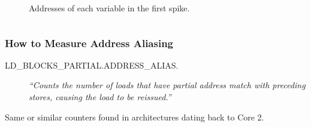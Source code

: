 \documentclass{beamer}
\begin{document}
\begin{frame}
\begin{columns}[T]
\begin{column}{.50\textwidth}
\begin{figure}
\begin{tikzpicture}[font=\footnotesize]

  \end{tikzpicture}
  \caption{Addresses of each variable in the first spike.}
\end{figure}


\end{column}
\end{columns}

\end{frame}


\begin{frame}[fragile]
  \frametitle{How to Measure Address Aliasing}

  \begin{description}
    \item[{\small LD\_BLOCKS\_PARTIAL.ADDRESS\_ALIAS.}] 
    \emph{``Counts the number of loads that have partial address match with preceding stores, causing the load to be reissued.''} 
    \cite[B.3.4.4]{OptimizationManual}
  \end{description}

  Same or similar counters found in architectures dating back to Core 2.



\end{frame}
\end{document}
